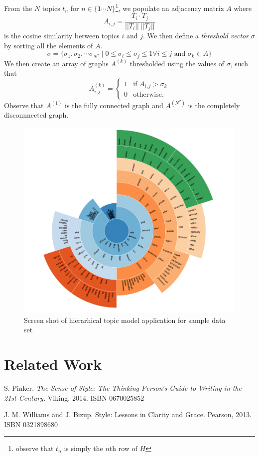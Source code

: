 \documentclass[12pt]{article}
\begin{document}
From the $N$ topics $t_n$ for $n \in \{1\cdots N\}$\footnote{observe that $t_n$ is simply the $n$th row of $H$}, we populate an adjacency matrix $A$ where $$A_{i,j} = \frac{T_i \cdot T_j}{||T_i|| \ ||T_j||}$$ is the cosine similarity between topics $i$ and $j$. We then define a \emph{threshold vector} $\sigma$ by sorting all the elements of $A$. $$\sigma = \{\sigma_1, \sigma_2, \cdots \sigma_{N^2} \mid0 \leq \sigma_{i} \leq \sigma_j \leq 1 \forall i \leq j\text{ and }\sigma_k \in A\}$$
We then create an array of graphs $A^{(k)}$ thresholded using the values of $\sigma$, such that  \[
A^{(k)}_{i,j} =
\begin{cases}
1 & \text{if } A_{i,j} >\sigma_k\\
0 & \text{otherwise.}
\end{cases}
\]
Observe that $A^{(1)}$ is the fully connected graph and $A^{(N^2)}$ is the completely disconnnected graph.
\begin{figure}
	\includegraphics[width=.5\textwidth]{img}
	\caption{Screen shot of hierarhical topic model application for sample data set}
\end{figure}
\section{Related Work}



\begin{thebibliography}{9}
	
	S. Pinker. \emph{The Sense of Style: The Thinking Person's Guide to Writing in the 21st Century.} Viking, 2014. ISBN 0670025852
	
	J. M. Williams and J. Bizup. Style: Lessons in Clarity and Grace. Pearson, 2013. ISBN 0321898680
\end{thebibliography}
\end{document}
